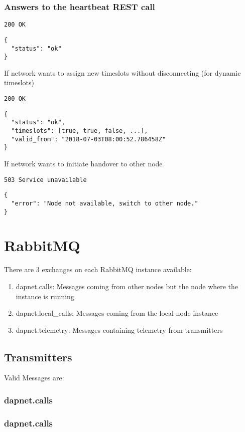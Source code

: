 \subsubsection{Answers to the heartbeat REST call}
\texttt{200 OK}
\begin{lstlisting}
{
  "status": "ok"
}
\end{lstlisting}

If network wants to assign new timeslots without disconnecting (for dynamic timeslots)

\texttt{200 OK}
\begin{lstlisting}
{
  "status": "ok",
  "timeslots": [true, true, false, ...],
  "valid_from": "2018-07-03T08:00:52.786458Z"
}
\end{lstlisting}

If network wants to initiate handover to other node

\texttt{503 Service unavailable}
\begin{lstlisting}
{
  "error": "Node not available, switch to other node."
}
\end{lstlisting}

\section{RabbitMQ}
\label{protocoldef:RabbitMQ}
There are 3 exchanges on each RabbitMQ instance available:
\begin{enumerate}
\item dapnet.calls: Messages coming from other nodes but the node where the instance is running
\item dapnet.local\_calls: Messages coming from the local node instance
\item dapnet.telemetry: Messages containing telemetry from transmitters
\end{enumerate}


\subsection{Transmitters}
\label{protocoldef:RabbitMQ:Transmitters}

Valid Messages are:

\subsubsection{dapnet.calls}
\label{protocoldef:RabbitMQ:dapnet.calls}



\subsubsection{dapnet.calls}
\label{protocoldef:RabbitMQ:dapnet.local_calls}




